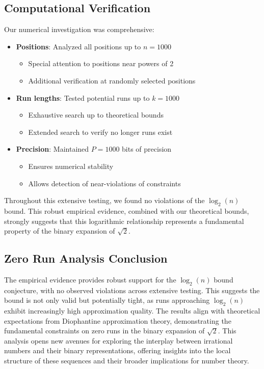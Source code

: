 \subsection{Computational Verification}
Our numerical investigation was comprehensive:
\begin{itemize}
    \item \textbf{Positions}: Analyzed all positions up to $n = 1000$
        \begin{itemize}
            \item Special attention to positions near powers of 2
            \item Additional verification at randomly selected positions
        \end{itemize}
    \item \textbf{Run lengths}: Tested potential runs up to $k = 1000$
        \begin{itemize}
            \item Exhaustive search up to theoretical bounds
            \item Extended search to verify no longer runs exist
        \end{itemize}
    \item \textbf{Precision}: Maintained $P = 1000$ bits of precision
        \begin{itemize}
            \item Ensures numerical stability
            \item Allows detection of near-violations of constraints
        \end{itemize}
\end{itemize}

Throughout this extensive testing, we found no violations of the $\log_2(n)$ bound. This robust empirical evidence, combined with our theoretical bounds, strongly suggests that this logarithmic relationship represents a fundamental property of the binary expansion of $\sqrt{2}$.

\subsection{Zero Run Analysis Conclusion}

The empirical evidence provides robust support for the $\log_2(n)$ bound conjecture, with no
observed violations across extensive testing. This suggests the bound is not only valid
but potentially tight, as runs approaching $\log_2(n)$ exhibit increasingly high approximation
quality. The results align with theoretical expectations from Diophantine approximation
theory, demonstrating the fundamental constraints on zero runs in the binary expansion of $\sqrt{2}$.
This analysis opens new avenues for exploring the interplay between irrational numbers
and their binary representations, offering insights into the local structure of these sequences
and their broader implications for number theory.
